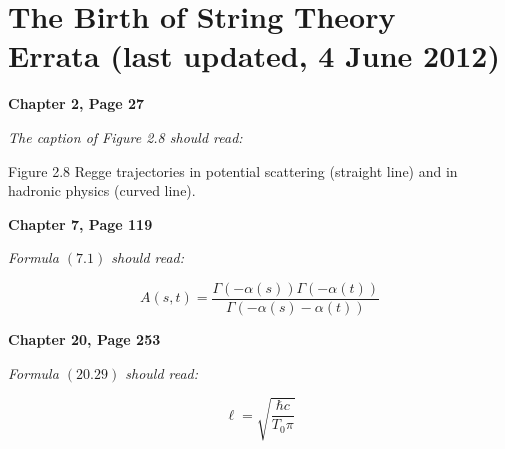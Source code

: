 \documentclass[cup5b]{cupbook}
\begin{document}
\chapter*{The Birth of String Theory \\
Errata (last updated, 4 June 2012)}



\bigskip\noindent\textbf{\Large Chapter 2, Page 27}

\medskip\noindent\hspace{.6cm}
\textit{The caption of Figure 2.8 should read:}

\medskip\noindent
Figure 2.8 Regge trajectories in potential scattering (straight line) 
and in hadronic physics (curved line).


\bigskip\noindent\textbf{Chapter 7, Page 119}

\medskip\noindent\hspace{.6cm}
\textit{Formula $(7.1)$ should read:}

\setcounter{chapter}{7}

\medskip\noindent
\begin{equation}
A(s,t)=\frac{\Gamma(-\alpha(s))
\Gamma(-\alpha(t))}{\Gamma(-\alpha(s)-\alpha(t))}
\end{equation}


\bigskip\noindent\textbf{Chapter 20, Page 253}

\medskip\noindent\hspace{.6cm}
\textit{Formula $(20.29)$ should read:}

\setcounter{chapter}{20}
\setcounter{equation}{28}

\medskip\noindent
\begin{equation}
\ell=\sqrt{\frac{\hbar c }{T_0\pi}}
\end{equation}
\end{document}
